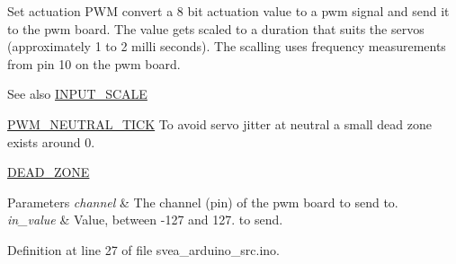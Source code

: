 Set actuation P\+WM convert a 8 bit actuation value to a pwm signal and send it to the pwm board. The value gets scaled to a duration that suits the servos (approximately 1 to 2 milli seconds). The scalling uses frequency measurements from pin 10 on the pwm board. 

\begin{DoxySeeAlso}{See also}
\hyperlink{group__ActuationToOutput_ga8e7323c31db382601e81947c2bba345b}{I\+N\+P\+U\+T\+\_\+\+S\+C\+A\+LE} 

\hyperlink{group__ActuationToOutput_gaa6aecad7bb848a436df0b7c89aa1f48f}{P\+W\+M\+\_\+\+N\+E\+U\+T\+R\+A\+L\+\_\+\+T\+I\+CK} To avoid servo jitter at neutral a small dead zone exists around 0. 

\hyperlink{settings_8h_a8f059a42c098816d4ccebaf48add0a4a}{D\+E\+A\+D\+\_\+\+Z\+O\+NE} 
\end{DoxySeeAlso}

\begin{DoxyParams}{Parameters}
{\em channel} & The channel (pin) of the pwm board to send to. \\
\hline
{\em in\+\_\+value} & Value, between -\/127 and 127. to send. \\
\hline
\end{DoxyParams}


Definition at line 27 of file svea\+\_\+arduino\+\_\+src.\+ino.

